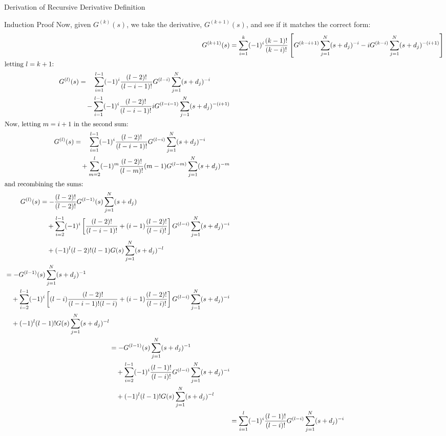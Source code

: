 \begin{chapter}{Derivation of Recursive Derivative Definition\label{app:math.deriveG}}
\begin{section}{Induction Proof}
    \noindent Now, given $G^{(k)}(s)$, we take the derivative,
    $G^{(k+1)}(s)$, and see if it matches the correct form:
    \begin{align}
      G^{(k+1)}(s) &= \sum_{i=1}^k (-1)^i \frac{(k-1)!}{(k-i)!} \left [
                      G^{(k-i+1)} \sum_{j=1}^N (s+d_j)^{-i} - iG^{(k-i)}\sum_{j=1}^N
                      (s+d_j)^{-(i+1)} \right ]\\
      \intertext{letting $l = k+1$:}
      \begin{split}
        G^{(l)}(s) &=\quad \sum_{i=1}^{l-1} (-1)^i \frac{(l-2)!}{(l-i-1)!} G^{(l-i)} \sum_{j=1}^N (s+d_j)^{-i} \\
                   &\quad-\sum_{i=1}^{l-1} (-1)^i\frac{(l-2)!}{(l-i-1)!}iG^{(l-i-1)}\sum_{j=1}^N (s+d_j)^{-(i+1)}
      \end{split}\\
      \intertext{Now, letting $m=i+1$ in the second sum:}
      \begin{split}
        G^{(l)}(s) & = \quad\sum_{i=1}^{l-1} (-1)^i \frac{(l-2)!}{(l-i-1)!}G^{(l-i)} \sum_{j=1}^N (s+d_j)^{-i} \\
                   &\quad+ \sum_{m=2}^{l} (-1)^m\frac{(l-2)!}{(l-m)!}(m-1)G^{(l-m)}\sum_{j=1}^N (s+d_j)^{-m}
      \end{split}\\
      \intertext{and recombining the sums:}
      \begin{split}
        G^{(l)}(s) &=-\frac{(l-2)!}{(l-2)!}G^{(l-1)}(s)\sum_{j=1}^N (s+d_j)\\ 
                   &\quad+ \sum_{i=2}^{l-1} (-1)^i \left [
                         \frac{(l-2)!}{(l-i-1)!} + (i-1)\frac{(l-2)!}{(l-i)!} \right
                         ]G^{(l-i)}\sum_{j=1}^N (s+d_j)^{-i}\\
                   &\quad+ (-1)^l (l-2)!(l-1)G(s)\sum_{j=1}^N (s+d_j)^{-l}
      \end{split}\\
      \begin{split}
        &=-G^{(l-1)}(s)\sum_{j=1}^N (s+d_j)^{-1}\\
        &\quad+ \sum_{i=2}^{l-1} (-1)^i \left [
          (l-i)\frac{(l-2)!}{(l-i-1)!(l-i)} + (i-1)\frac{(l-2)!}{(l-i)!} \right ]
          G^{(l-i)}\sum_{j=1}^N (s+d_j)^{-i}\\
        &\quad+ (-1)^l (l-1)!G(s)\sum_{j=1}^N (s+d_j)^{-l}
      \end{split}\\
      \begin{split}
        &=-G^{(l-1)}(s)\sum_{j=1}^N (s+d_j)^{-1}\\
        &\quad+\sum_{i=2}^{l-1} (-1)^i
            \frac{(l-1)!}{(l-i)!}G^{(l-i)}\sum_{j=1}^N (s+d_j)^{-i}\\
        &\quad+ (-1)^l (l-1)!G(s)\sum_{j=1}^N (s+d_j)^{-l}
      \end{split}\\
      & =  \sum_{i=1}^{l} (-1)^i \frac{(l-1)!}{(l-i)!}G^{(l-i)}\sum_{j=1}^N
           (s+d_j)^{-i}
    \end{align}


\end{section}
\end{chapter}
